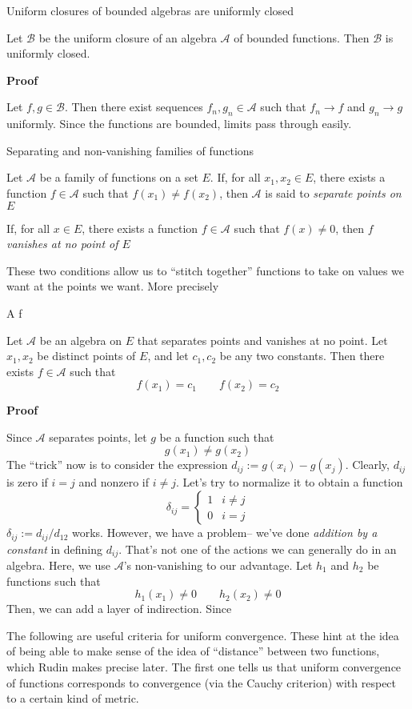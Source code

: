 \begin{theorem} Uniform closures of bounded algebras are uniformly closed

    Let $\mathscr{B}$ be the uniform closure of an algebra $\mathscr{A}$ of bounded functions. Then $\mathscr{B}$ is uniformly closed.

    \textbf{Proof}

    Let $f,g \in \mathscr{B}$. Then there exist sequences $f_n, g_n \in \mathscr{A}$ such that $f_n \to f$ and $g_n \to g$ uniformly. Since the functions are bounded, limits pass through easily.
\end{theorem}

\begin{definition} Separating and non-vanishing families of functions

    Let $\mathscr{A}$ be a family of functions on a set $E$. If, for all $x_1, x_2 \in E$, there exists a function $f \in \mathscr{A}$ such that $f(x_1) \neq f(x_2)$, then $\mathscr{A}$ is said to \textit{separate points on $E$}

    If, for all $x \in E$, there exists a function $f \in \mathscr{A}$ such that $f(x) \neq 0$, then $f$ \textit{vanishes at no point of $E$} 
\end{definition}

These two conditions allow us to ``stitch together'' functions to take on values we want at the points we want. More precisely

\begin{theorem}
    {A f}

    Let $\mathscr{A}$ be an algebra on $E$ that separates points and vanishes at no point. Let $x_1, x_2$ be distinct points of $E$, and let $c_1, c_2$ be any two constants. Then there exists $f \in \mathscr{A}$ such that
    \[f(x_1) = c_1 \qquad f(x_2) = c_2\]

    \textbf{Proof}

    Since $\mathscr{A}$ separates points, let $g$ be a function such that 
    \[g(x_1) \neq g(x_2)\]
    The ``trick'' now is to consider the expression $d_{ij} := g(x_i) - g(x_j)$. Clearly, $d_{ij}$ is zero if $i = j$ and nonzero if $i \neq j$. Let's try to normalize it to obtain a function 
    \[\delta_{ij} = \begin{cases}
        1 & i \neq j  \\
        0 & i = j
    \end{cases}\]
    $\delta_{ij} := d_{ij}/d_{12}$ works. However, we have a problem-- we've done \textit{addition by a constant} in defining $d_{ij}$. That's not one of the actions we can generally do in an algebra. Here, we use $\mathscr{A}$'s non-vanishing to our advantage. Let $h_1$ and $h_2$ be functions such that
    \[h_1(x_1) \neq 0 \qquad h_2(x_2) \neq 0\]
    Then, we can add a layer of indirection. Since
\end{theorem}
The following are useful criteria for uniform convergence. These hint at the idea of being able to make sense of the idea of ``distance'' between two functions, which Rudin makes precise later. The first one tells us that uniform convergence of functions corresponds to convergence (via the Cauchy criterion) with respect to a certain kind of metric. 

